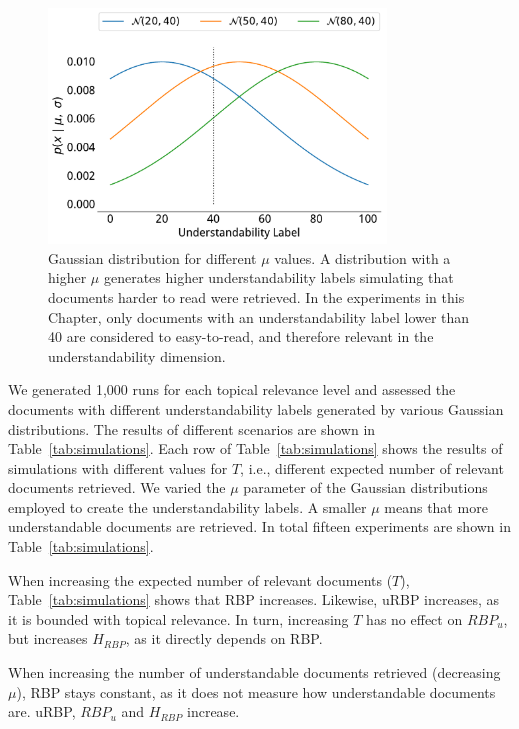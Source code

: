 \begin{figure}[t!]
  \centering
   \includegraphics[width=0.8\textwidth]{figs/gaussians}
    \caption{Gaussian distribution for different $\mu$ values. A distribution with a higher $\mu$ generates higher understandability labels simulating that documents harder to read were retrieved. In the experiments in this Chapter, only documents with an understandability label lower than 40 are considered to easy-to-read, and therefore relevant in the understandability dimension.}
  \label{fig:gaussians}
\end{figure}


We generated 1,000 runs for each topical relevance level and assessed the documents with different understandability labels generated by various Gaussian distributions. 
The results of different scenarios are shown in Table~\ref{tab:simulations}.
Each row of Table~\ref{tab:simulations} shows the results of simulations with different values for $T$, i.e., different expected number of relevant documents retrieved.
We varied the $\mu$ parameter of the Gaussian distributions employed to create the understandability labels. A smaller $\mu$ means that more understandable documents are retrieved.
In total fifteen experiments are shown in Table~\ref{tab:simulations}.

When increasing the expected number of relevant documents ($T$), Table~\ref{tab:simulations} shows that RBP increases. Likewise, uRBP increases, as it is bounded with topical relevance.
In turn, increasing $T$ has no effect on $RBP_u$, but increases $H_{RBP}$, as it directly depends on RBP.

When increasing the number of understandable documents retrieved (decreasing $\mu$), RBP stays constant, as it does not measure how understandable documents are.
uRBP, $RBP_u$ and $H_{RBP}$ increase.

